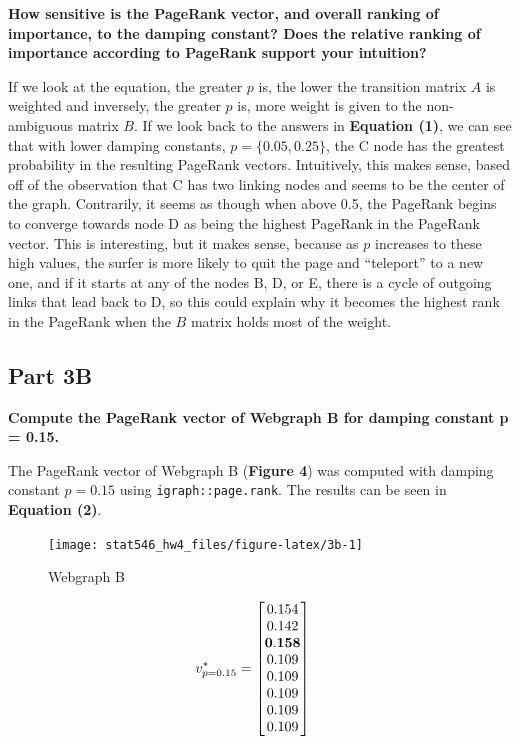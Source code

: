 \documentclass[]{article}
\begin{document}
\textbf{How sensitive is the PageRank vector, and overall ranking of
importance, to the damping constant? Does the relative ranking of
importance according to PageRank support your intuition?}

If we look at the equation, the greater \(p\) is, the lower the
transition matrix \(A\) is weighted and inversely, the greater \(p\) is,
more weight is given to the non-ambiguous matrix \(B\). If we look back
to the answers in \textbf{Equation (1)}, we can see that with lower
damping constants, \(p = \{0.05, 0.25\}\), the C node has the greatest
probability in the resulting PageRank vectors. Intuitively, this makes
sense, based off of the observation that C has two linking nodes and
seems to be the center of the graph. Contrarily, it seems as though when
above 0.5, the PageRank begins to converge towards node D as being the
highest PageRank in the PageRank vector. This is interesting, but it
makes sense, because as \(p\) increases to these high values, the surfer
is more likely to quit the page and ``teleport'' to a new one, and if it
starts at any of the nodes B, D, or E, there is a cycle of outgoing
links that lead back to D, so this could explain why it becomes the
highest rank in the PageRank when the \(B\) matrix holds most of the
weight.

\subsection{Part 3B}\label{part-3b}

\textbf{Compute the PageRank vector of Webgraph B for damping constant p = 0.15.}

The PageRank vector of Webgraph B (\textbf{Figure 4}) was computed with
damping constant \(p = 0.15\) using \texttt{igraph::page.rank}. The
results can be seen in \textbf{Equation (2)}.

\begin{figure}[h]

{\centering \texttt{[image: stat546\_hw4\_files/figure-latex/3b-1]} 

}

\caption{Webgraph B}\label{fig:3b}
\end{figure}

\begin{align}
v_{p=0.15}^{*} &= \begin{bmatrix}
   0.154 \\
   0.142 \\
   \bf{0.158} \\
   0.109 \\
   0.109 \\
   0.109 \\
   0.109 \\
   0.109
 \end{bmatrix} 
\end{align}
\end{document}
